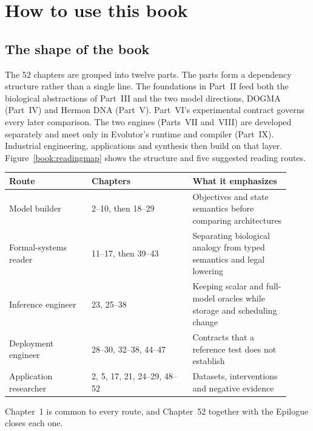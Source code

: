 \chapter*{How to use this book}

\section*{The shape of the book}
The 52 chapters are grouped into twelve parts. The parts form a dependency structure
rather than a single line. The foundations in Part~II feed both the biological
abstractions of Part~III and the two model directions, DOGMA (Part~IV) and Hermon DNA
(Part~V). Part~VI's experimental contract governs every later comparison. The two engines
(Parts~VII and~VIII) are developed separately and meet only in Evolutor's runtime and
compiler (Part~IX). Industrial engineering, applications and synthesis then build on
that layer. Figure~\ref{book:readingmap} shows the structure and five suggested reading
routes.


\begin{center}\small
\begin{tabular}{@{}P{0.27\linewidth}P{0.33\linewidth}P{0.32\linewidth}@{}}
\toprule
Route & Chapters & What it emphasizes\\\midrule
Model builder & 2--10, then 18--29 & Objectives and state semantics before comparing architectures\\
Formal-systems reader & 11--17, then 39--43 & Separating biological analogy from typed semantics and legal lowering\\
Inference engineer & 23, 25--38 & Keeping scalar and full-model oracles while storage and scheduling change\\
Deployment engineer & 28--30, 32--38, 44--47 & Contracts that a reference test does not establish\\
Application researcher & 2, 5, 17, 21, 24--29, 48--52 & Datasets, interventions and negative evidence\\
\bottomrule
\end{tabular}
\end{center}
Chapter~1 is common to every route, and Chapter~52 together with the Epilogue closes each
one.

